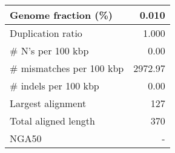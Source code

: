 \documentclass[12pt,a4paper]{article}
\begin{document}
\begin{table}[ht]
\begin{center}
\begin{tabular}{|l*{1}{|r}|}
Genome fraction (\%) & 0.010 \\ \hline
Duplication ratio & 1.000 \\ \hline
\# N's per 100 kbp & 0.00 \\ \hline
\# mismatches per 100 kbp & 2972.97 \\ \hline
\# indels per 100 kbp & 0.00 \\ \hline
Largest alignment & 127 \\ \hline
Total aligned length & 370 \\ \hline
NGA50 & - \\ \hline
\end{tabular}
\end{center}
\end{table}
\end{document}
